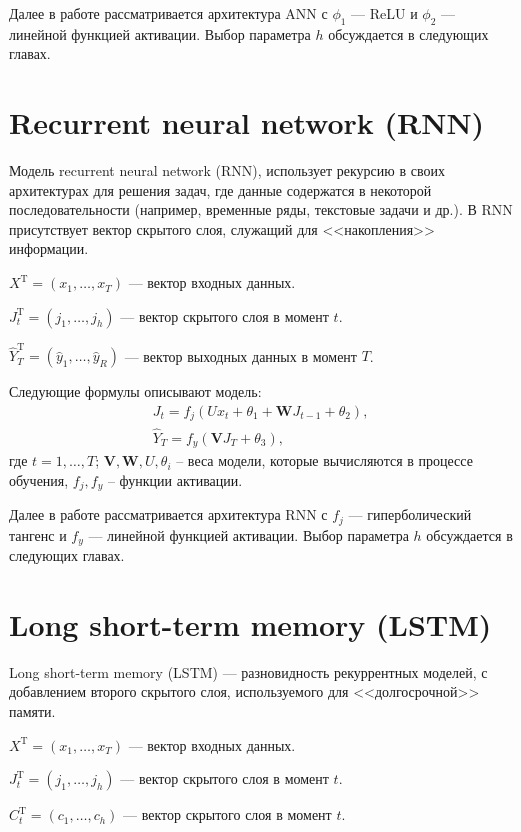 \documentclass[specialist,
               substylefile = spbu.rtx,
               subf,href,colorlinks=true, 12p]{disser}
\begin{document}
Далее в работе рассматривается архитектура ANN с $\phi_1$ --- ReLU и $\phi_2$ --- линейной функцией активации. Выбор параметра $h$ обсуждается в следующих главах.

\section{Recurrent neural network (RNN)}

Модель recurrent neural network (RNN), использует рекурсию в своих архитектурах для решения задач, где данные содержатся в некоторой последовательности (например, временные ряды, текстовые задачи и др.). В RNN присутствует вектор скрытого слоя, служащий для <<накопления>> информации.

$X^\mathrm{T} = (x_1, \ldots, x_T)$ --- вектор входных данных.

$ J_t^\mathrm{T} = (j_1, \ldots, j_h)$ --- вектор скрытого слоя в момент $t$.

$ \widehat{Y}_T^\mathrm{T} = (\hat{y}_1, \ldots, \hat{y}_R) $ --- вектор выходных данных в момент $T$.

Следующие формулы описывают модель:
\begin{gather*}
	J_t = f_j(U x_{t} + \theta_1 + \mathbf{W} J_{t-1} + \theta_2), \\
	\widehat{Y}_T = f_y(\mathbf{V} J_T + \theta_3),
\end{gather*}
где $t = 1, \ldots, T$;  $\mathbf{V}, \mathbf{W}, U, \theta_i$ -- веса модели, которые вычисляются в процессе обучения, $f_j, f_y$ -- функции активации.

Далее в работе рассматривается архитектура RNN с $f_j$ --- гиперболический тангенс и $f_y$ --- линейной функцией активации. Выбор параметра $h$ обсуждается в следующих главах.


\section{Long short-term memory (LSTM)}

Long short-term memory (LSTM) --- разновидность рекуррентных моделей, с добавлением второго скрытого слоя, используемого для <<долгосрочной>> памяти.

$X^\mathrm{T} = (x_1, \ldots, x_T)$ --- вектор входных данных.

$ J_t^\mathrm{T} = (j_1, \ldots, j_h)$ --- вектор скрытого слоя в момент $t$.

$ C_t^\mathrm{T} = (c_1, \ldots, c_h)$ --- вектор скрытого слоя в момент $t$.
\end{document}
